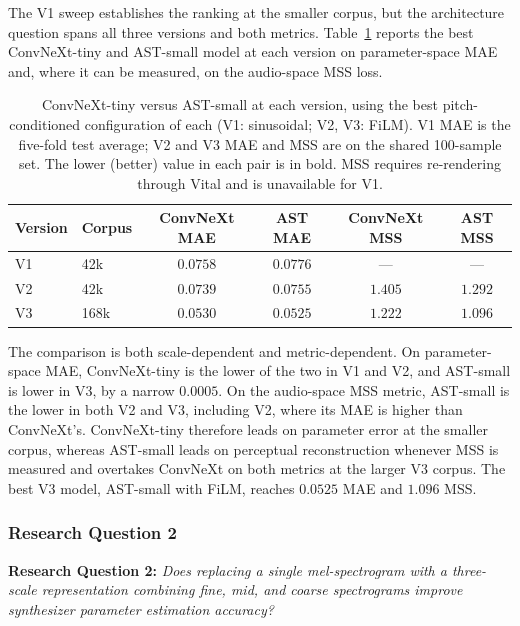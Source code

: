 \noindent
The V1 sweep establishes the ranking at the smaller corpus, but the architecture question spans all three versions and both metrics. Table~\ref{tab:arch_compare} reports the best ConvNeXt-tiny and AST-small model at each version on parameter-space MAE and, where it can be measured, on the audio-space MSS loss.

\begin{table}[H]
\centering
\renewcommand{\arraystretch}{1.3}
\begin{tabular}{llcccc}
\hline
\textbf{Version} & \textbf{Corpus} & \textbf{ConvNeXt MAE} & \textbf{AST MAE} & \textbf{ConvNeXt MSS} & \textbf{AST MSS} \\
\hline
V1 & 42k  & $\mathbf{0.0758}$ & $0.0776$ & --- & --- \\
V2 & 42k  & $\mathbf{0.0739}$ & $0.0755$ & $1.405$ & $\mathbf{1.292}$ \\
V3 & 168k & $0.0530$ & $\mathbf{0.0525}$ & $1.222$ & $\mathbf{1.096}$ \\
\hline
\end{tabular}
\vspace{0.3cm}
\caption{ConvNeXt-tiny versus AST-small at each version, using the best pitch-conditioned configuration of each (V1: sinusoidal; V2, V3: FiLM). V1 MAE is the five-fold test average; V2 and V3 MAE and MSS are on the shared 100-sample set. The lower (better) value in each pair is in bold. MSS requires re-rendering through Vital and is unavailable for V1.}
\label{tab:arch_compare}
\end{table}

\noindent
The comparison is both scale-dependent and metric-dependent. On parameter-space MAE, ConvNeXt-tiny is the lower of the two in V1 and V2, and AST-small is lower in V3, by a narrow $0.0005$. On the audio-space MSS metric, AST-small is the lower in both V2 and V3, including V2, where its MAE is higher than ConvNeXt's. ConvNeXt-tiny therefore leads on parameter error at the smaller corpus, whereas AST-small leads on perceptual reconstruction whenever MSS is measured and overtakes ConvNeXt on both metrics at the larger V3 corpus. The best V3 model, AST-small with FiLM, reaches $0.0525$ MAE and $1.096$ MSS.

\subsubsection{Research Question 2}
\label{subsec:rq2}

\noindent
\textbf{Research Question 2:} \textit{Does replacing a single mel-spectrogram with a three-scale representation combining fine, mid, and coarse spectrograms improve synthesizer parameter estimation accuracy?}

